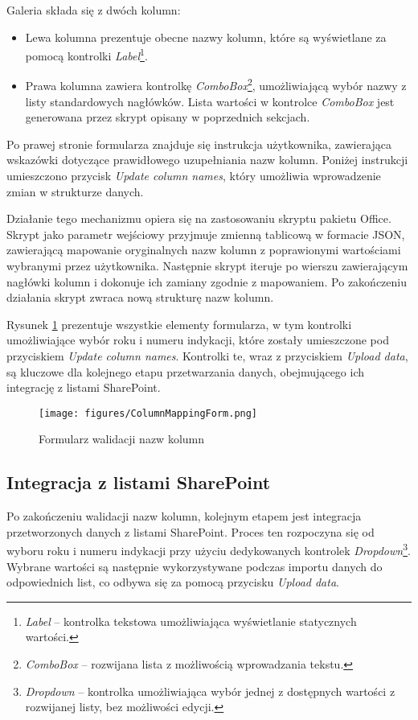 \noindent Galeria składa się z dwóch kolumn: \begin{itemize} \item Lewa kolumna prezentuje obecne nazwy kolumn, które są wyświetlane za pomocą kontrolki \emph{Label}\footnote{\emph{Label} -- kontrolka tekstowa umożliwiająca wyświetlanie statycznych wartości.}. \item Prawa kolumna zawiera kontrolkę \emph{ComboBox}\footnote{\emph{ComboBox} -- rozwijana lista z możliwością wprowadzania tekstu.}, umożliwiającą wybór nazwy z listy standardowych nagłówków. Lista wartości w kontrolce \emph{ComboBox} jest generowana przez skrypt opisany w poprzednich sekcjach. \end{itemize}

Po prawej stronie formularza znajduje się instrukcja użytkownika, zawierająca wskazówki dotyczące prawidłowego uzupełniania nazw kolumn. Poniżej instrukcji umieszczono przycisk \emph{Update column names}, który umożliwia wprowadzenie zmian w strukturze danych.

\noindent Działanie tego mechanizmu opiera się na zastosowaniu skryptu pakietu Office. Skrypt jako parametr wejściowy przyjmuje zmienną tablicową w formacie JSON, zawierającą mapowanie oryginalnych nazw kolumn z poprawionymi wartościami wybranymi przez użytkownika. Następnie skrypt iteruje po wierszu zawierającym nagłówki kolumn i dokonuje ich zamiany zgodnie z mapowaniem. Po zakończeniu działania skrypt zwraca nową strukturę nazw kolumn.

Rysunek \ref{fig:columnmappingform} prezentuje wszystkie elementy formularza, w tym kontrolki umożliwiające wybór roku i numeru indykacji, które zostały umieszczone pod przyciskiem \emph{Update column names}. Kontrolki te, wraz z przyciskiem \emph{Upload data}, są kluczowe dla kolejnego etapu przetwarzania danych, obejmującego ich integrację z listami SharePoint. 


\begin{figure}[t]
    \centering
    \texttt{[image: figures/ColumnMappingForm.png]}
    \caption{Formularz walidacji nazw kolumn}
    \label{fig:columnmappingform}
\end{figure}

\subsection{Integracja z listami SharePoint} Po zakończeniu walidacji nazw kolumn, kolejnym etapem jest integracja przetworzonych danych z listami SharePoint. Proces ten rozpoczyna się od wyboru roku i numeru indykacji przy użyciu dedykowanych kontrolek \emph{Dropdown}\footnote{\emph{Dropdown} -- kontrolka umożliwiająca wybór jednej z dostępnych wartości z rozwijanej listy, bez możliwości edycji.}. Wybrane wartości są następnie wykorzystywane podczas importu danych do odpowiednich list, co odbywa się za pomocą przycisku \emph{Upload data}. 

